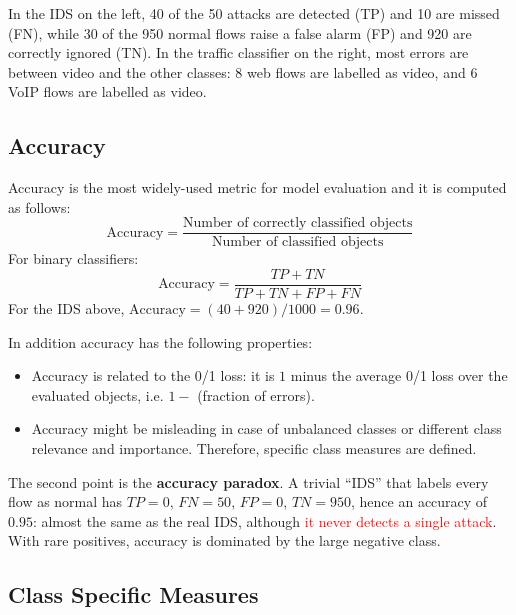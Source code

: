 In the IDS on the left, 40 of the 50 attacks are detected (TP) and 10 are missed (FN), while 30 of the 950 normal flows raise a false alarm (FP) and 920 are correctly ignored (TN). In the traffic classifier on the right, most errors are between video and the other classes: 8 web flows are labelled as video, and 6 VoIP flows are labelled as video.

\subsection{Accuracy}

Accuracy is the most widely-used metric for model evaluation and it is computed as follows:
\[
\text{Accuracy} = \frac{\text{Number of correctly classified objects}}{\text{Number of classified objects}}
\]
For binary classifiers:
\[
\text{Accuracy} = \frac{TP + TN}{TP + TN + FP + FN}
\]
For the IDS above, $\text{Accuracy} = (40 + 920)/1000 = 0.96$.

In addition accuracy has the following properties:
\begin{itemize}
    \item Accuracy is related to the 0/1 loss: it is $1$ minus the average 0/1 loss over the evaluated objects, i.e. $1 -$ (fraction of errors).
    \item Accuracy might be misleading in case of unbalanced classes or different class relevance and importance. Therefore, specific class measures are defined.
\end{itemize}

The second point is the \textbf{accuracy paradox}. A trivial ``IDS'' that labels every flow as normal has $TP = 0$, $FN = 50$, $FP = 0$, $TN = 950$, hence an accuracy of $0.95$: almost the same as the real IDS, although \textcolor{red}{it never detects a single attack}. With rare positives, accuracy is dominated by the large negative class.

\subsection{Class Specific Measures}


